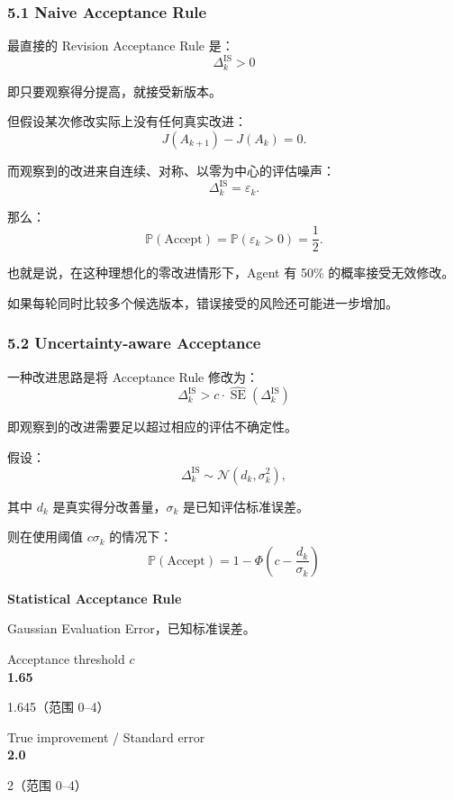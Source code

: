\hypertarget{part-3-40-0001-naive-acceptance-rule}{%
\subsubsection{5.1 Naive Acceptance Rule}\label{part-3-40-0001-naive-acceptance-rule}}

最直接的 Revision Acceptance Rule 是：
\[\boxed{
\Delta_k^{\mathrm{IS}}>0
}\]

即只要观察得分提高，就接受新版本。

但假设某次修改实际上没有任何真实改进：
\[J(A_{k+1})-J(A_k)=0.\]

而观察到的改进来自连续、对称、以零为中心的评估噪声：
\[\Delta_k^{\mathrm{IS}}=\varepsilon_k.\]

那么：
\[\mathbb P(\text{Accept})
=
\mathbb P(\varepsilon_k>0)
=
\frac12.\]

也就是说，在这种理想化的零改进情形下，Agent 有 50\% 的概率接受无效修改。

如果每轮同时比较多个候选版本，错误接受的风险还可能进一步增加。

\hypertarget{part-3-40-0001-uncertainty-aware-acceptance}{%
\subsubsection{5.2 Uncertainty-aware Acceptance}\label{part-3-40-0001-uncertainty-aware-acceptance}}

一种改进思路是将 Acceptance Rule 修改为：
\[\boxed{
\Delta_k^{\mathrm{IS}}
>
c\cdot
\widehat{\operatorname{SE}}
(\Delta_k^{\mathrm{IS}})
}\]

即观察到的改进需要足以超过相应的评估不确定性。

假设：
\[\Delta_k^{\mathrm{IS}}
\sim\mathcal N(d_k,\sigma_k^2),\]

其中 \(d_k\) 是真实得分改善量，\(\sigma_k\) 是已知评估标准误差。

则在使用阈值 \(c\sigma_k\) 的情况下：
\[\boxed{
\mathbb P(\text{Accept})
=
1-\Phi\left(c-\frac{d_k}{\sigma_k}\right)
}\]

\textbf{Statistical Acceptance Rule}

Gaussian Evaluation Error，已知标准误差。

Acceptance threshold \(c\)\\
\textbf{1.65}

1.645（范围 0--4）

True improvement / Standard error\\
\textbf{2.0}

2（范围 0--4）

